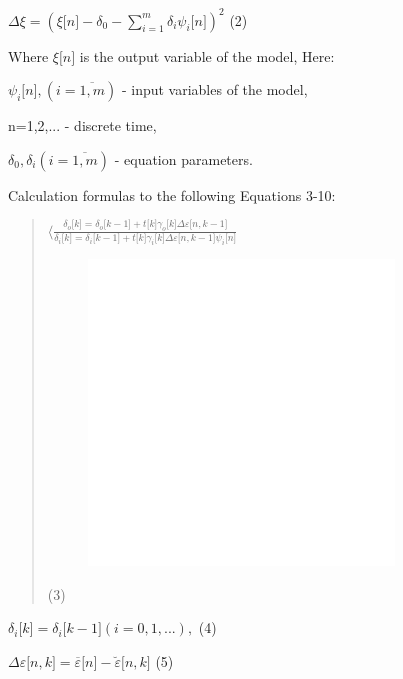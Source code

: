 \(\Delta\xi = (\xi\lbrack n\rbrack - \delta_{0} - \sum_{i = 1}^{m}{\delta_{i}\psi_{i}}\lbrack n\rbrack)^{2}\)
(2)

Where \(\xi\lbrack n\rbrack\) is the output variable of the model, Here:

\(\psi_{i}\lbrack n\rbrack,(i = \overline{1,m})\) - input variables of
the model,

n=1,2,... - discrete time,

\(\delta_{0},\delta_{i}(i = \overline{1,m})\) - equation parameters.

Calculation formulas to the following Equations 3-10:

\begin{quote}
\(\langle\frac{\delta_{o}\lbrack k\rbrack = \delta_{o}\lbrack k - 1\rbrack + t\lbrack k\rbrack\gamma_{o}\lbrack k\rbrack\Delta\varepsilon\lbrack n,k - 1\rbrack}{\delta_{i}\lbrack k\rbrack = \delta_{i}\lbrack k - 1\rbrack + t\lbrack k\rbrack\gamma_{i}\lbrack k\rbrack\Delta\varepsilon\lbrack n,k - 1\rbrack\psi_{i}\lbrack n\rbrack}\)\begin{figure}[H]
	\centering
	\includegraphics[width=0.8\textwidth]{assets/6}
	\caption*{}
\end{figure}
(3)
\end{quote}

\(\delta_{i}\lbrack k\rbrack = \delta_{i}\lbrack k - 1\rbrack(i = 0,1,...),\)
(4)

\(\Delta\varepsilon\lbrack n,k\rbrack = \overline{\varepsilon}\lbrack n\rbrack - \breve{\varepsilon}\lbrack n,k\rbrack\)
(5)

